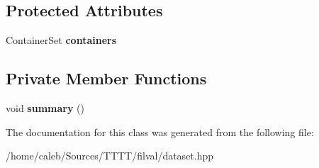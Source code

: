 \subsection*{Protected Attributes}
\begin{DoxyCompactItemize}
\item 
\hypertarget{classfv_1_1DataSet_a8bfd9b92632c1ec6c292b7a97578b75c}{}\label{classfv_1_1DataSet_a8bfd9b92632c1ec6c292b7a97578b75c} 
Container\+Set {\bfseries containers}
\end{DoxyCompactItemize}
\subsection*{Private Member Functions}
\begin{DoxyCompactItemize}
\item 
\hypertarget{classfv_1_1DataSet_aaa8a985360a4848304aa3c9ed39d11ff}{}\label{classfv_1_1DataSet_aaa8a985360a4848304aa3c9ed39d11ff} 
void {\bfseries summary} ()
\end{DoxyCompactItemize}


The documentation for this class was generated from the following file\+:\begin{DoxyCompactItemize}
\item 
/home/caleb/\+Sources/\+T\+T\+T\+T/filval/dataset.\+hpp\end{DoxyCompactItemize}
